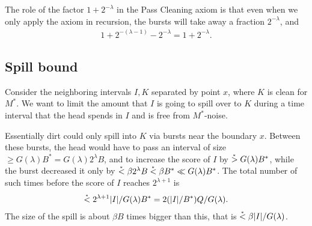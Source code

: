 \documentclass[12pt]{memoir}
\renewcommand{\le}{\leq}
\renewcommand{\ge}{\geq}
\def\B{B}
\newcommand{\cns}[1]{c_{\textrm{\upshape #1}}}
\newcommand{\cSpace}{\cns{space}}
\newcommand{\cIncr}{\cns{incr}}
\begin{document}
The role of the factor \( 1+2^{-\lambda} \) in the Pass Cleaning axiom is that
even when we only apply the axiom in recursion, the bursts will take away
a fraction \( 2^{-\lambda} \), and
\begin{align*}
 1+2^{-(\lambda-1)}-2^{-\lambda} = 1 + 2^{-\lambda}.
 \end{align*}






\subsection{Spill bound}

Consider the neighboring intervals \( I,K \) separated by point \( x \),
where \( K \) is clean for \( M^{*} \).
We want to limit the amount that \( I \) is going to spill over to \( K \) during a time
interval that the head spends in \( I \) and is free from \( M^{*} \)-noise.

Essentially dirt could only spill into \( K \) via bursts near the boundary \( x \).
Between these bursts, the head would have to pass an interval of size 
\( \ge G(\lambda)\B^{*} =G(\lambda)2^{\lambda}\B \), and to increase the score of \( I \) 
by \( \gem G(\lambda)\B^{*} \), while the burst decreased it only by 
\( \lem \beta 2^{\lambda}\B\lem\beta\B^{*}\ll G(\lambda)\B^{*} \).
The total number of such times before the score of \( I \) reaches \( 2^{\lambda+1} \) is
\begin{align*}
   \lem 2^{\lambda+1}|I|/G(\lambda)\B^{*} = 2(|I|/\B^{*}) Q/G(\lambda).
 \end{align*}
The size of the spill is about \( \beta\B \) times bigger than this,
that is \( \stackrel{{}_*}{<} \beta |I|/G(\lambda) \).
\end{document}
